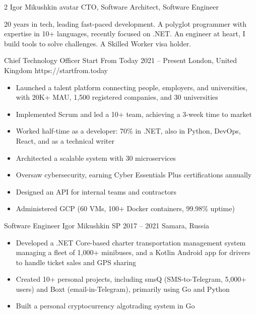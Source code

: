\documentclass[9pt,a4paper]{igrmkcv}
\begin{document}
\begin{paracol}{2}
\cvMakeHeader
    {Igor Mikushkin}
    {avatar}
    {CTO, Software Architect, Software Engineer}

    20 years in tech, leading fast-paced development.
    A polyglot programmer with expertise in 10+ languages, recently focused on .NET.
    An engineer at heart, I build tools to solve challenges.
    A Skilled Worker visa holder.

    \cvLeftEvent
        {Chief Technology Officer}
        {Start From Today}
        {2021 -- Present}
        {London, United Kingdom}
        {https://startfrom.today}

        \begin{itemize}
            \item Launched a talent platform connecting people, employers, and universities,
                  with 20K+ MAU, 1,500 registered companies, and 30 universities
            \item Implemented Scrum and led a 10+ team,
                  achieving a 3-week time to market
            \item Worked half-time as a developer: 70\% in .NET,
                  also in Python, DevOps, React, and as a technical writer
            \item Architected a scalable system with 30 microservices
            \item Oversaw cybersecurity, earning Cyber Essentials Plus certifications annually
            \item Designed an API for internal teams and contractors
            \item Administered GCP (60 VMs, 100+ Docker containers, 99.98\% uptime)
        \end{itemize}

    \cvLeftEvent
        {Software Engineer}
        {Igor Mikushkin SP}
        {2017 -- 2021}
        {Samara, Russia}
        {}

        \begin{itemize}
            \item Developed a .NET Core-based charter transportation management system
                  managing a fleet of 1,000+ minibuses,
                  and a Kotlin Android app for drivers to handle ticket sales and GPS sharing
            \item Created 10+ personal projects,
                  including smsQ (SMS-to-Telegram, 5,000+ users)
                  and Boxt (email-in-Telegram), primarily using Go and Python
            \item Built a personal cryptocurrency algotrading system in Go
        \end{itemize}


\end{paracol}
\end{document}
